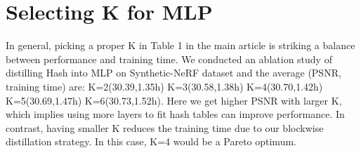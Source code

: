 \documentclass[letterpaper]{article} \usepackage{aaai23}  \usepackage{times}  \usepackage{helvet}  \usepackage{courier}  \usepackage[hyphens]{url}  \usepackage{graphicx} \urlstyle{rm} \def\UrlFont{\rm}  \usepackage{natbib}  \usepackage{caption} \frenchspacing  \setlength{\pdfpagewidth}{8.5in}  \setlength{\pdfpageheight}{11in}  \usepackage{multirow}
\begin{document}
\begin{table*}[b]
\centering
{}
\caption{The metrics on Synthetic-NeRF dataset. "w/o" indicates without constraining the value range of density, and 'w/' means with constraining the value range of density  }
\label{tab-clip-vs-noclip-sys}
\end{table*}

\section{Selecting K for MLP}
In general, picking a proper K in Table 1 in the main article is striking a balance between performance and training time. We conducted an ablation study of distilling Hash into MLP on Synthetic-NeRF dataset and the average (PSNR, training time) are:
K=2(30.39,1.35h)
K=3(30.58,1.38h)
K=4(30.70,1.42h)
K=5(30.69,1.47h)
K=6(30.73,1.52h).
Here we get higher PSNR with larger K, which implies using more layers to fit hash tables can improve performance. In contrast, having smaller K reduces the training time due to our blockwise distillation strategy. In this case, K=4 would be a Pareto optimum.
\end{document}
